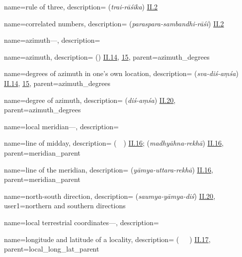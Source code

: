 {
        name={rule of three},
        description={ (\textit{trai-rāśika}) \hyperlink{Sii2}{II.2}}
}

{
        name={correlated numbers},
        description={ (\textit{paraspara-sambandhi-rāśi}) \hyperlink{Sii2}{II.2}}
}

{
        name={azimuth---},
        description={\phantom{x}\nopagebreak}
}

{
        name={azimuth},
        description={ (\samt) \hyperlink{Pii14}{II.14}, \hyperlink{Pii15}{15}},
        parent={azimuth_degrees}
}

{
        name={degrees of azimuth in one's own location},
        description={ (\textit{sva-diś-aṃśa}) \hyperlink{Sii14}{II.14}, \hyperlink{Sii15}{15}},
        parent={azimuth_degrees}
}


{
        name={degree of azimuth},
        description={ (\textit{diś-aṃśa}) \hyperlink{Sii20}{II.20}},
        parent={azimuth_degrees}
}

{
        name={local meridian---},
        description={\phantom{x}\nopagebreak}
}

{
        name={line of midday},
        description={ (\khatt\ \nisf\ \alnahar) \hyperlink{Pii16}{II.16};  (\textit{madhyāhna-rekhā}) \hyperlink{Sii16}{II.16}},
        parent={meridian_parent}
}

{
        name={line of the meridian},
        description={ (\textit{yāmya-uttara-rekhā}) \hyperlink{Sii16}{II.16}},
        parent={meridian_parent}
}

{
        name={north-south direction},
        description={ (\textit{saumya-yāmya-diś}) \hyperlink{Sii20}{II.20}},
        user1={northern and southern directions}
}

{
        name={local terrestrial coordinates---},
        description={\phantom{x}\nopagebreak}
}

{
        name={longitude and latitude of a locality},
        description={ (\tul\ \va\ \ard\idafaconsonant\ \balad) \hyperlink{Pii17}{II.17}},
        parent={local_long_lat_parent}
}


